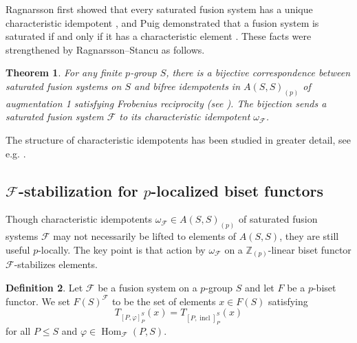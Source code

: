 \documentclass[]{amsart}
\newcommand{\Hom}{\operatorname{Hom}}
\newcommand{\on}[1]{\operatorname{#1}}
\newcommand{\calF}{\mathcal{F}}
\newcommand{\bbZ}{\mathbb{Z}}
\newtheorem{theorem}{Theorem}[section]
\theoremstyle{remark}
\theoremstyle{definition}
\newtheorem{definition}[theorem]{Definition}
\begin{document}
	Ragnarsson first showed that every saturated fusion system has a unique characteristic idempotent \cite{Rag06}, and Puig demonstrated that a fusion system is saturated if and only if it has a characteristic element \cite{Pui09}. These facts were strengthened by Ragnarsson--Stancu as follows. 
	
	\begin{theorem}\cite[Theorem C]{RS13}
		For any finite $p$-group $S$, there is a bijective correspondence between saturated fusion systems on $S$ and bifree idempotents in $A(S,S)_{(p)}$ of augmentation 1 satisfying Frobenius reciprocity (see \cite[Definition 7.1]{RS13}). The bijection sends a saturated fusion system $\calF$ to its characteristic idempotent $\omega_\calF$. 
	\end{theorem}
	
	The structure of characteristic idempotents has been studied in greater detail, see e.g. \cite{BD12, GSY15, Ree16}. 
	
	\subsection{$\calF$-stabilization for $p$-localized biset functors}
	
	Though characteristic idempotents $\omega_\calF \in A(S,S)_{(p)}$ of saturated fusion systems $\calF$ may not necessarily be lifted to elements of $A(S,S)$, they are still useful $p$-locally. The key point is that action by $\omega_\calF$ on a $\bbZ_{(p)}$-linear biset functor $\calF$-stabilizes elements. 
	
	\begin{definition}\cite[Definition 2.2]{RY18}
		Let $\calF$ be a fusion system on a $p$-group $S$ and let $F$ be a $p$-biset functor. We set $F(S)^\calF$ to be the set of elements $x\in F(S)$ satisfying \[T_{[P, \varphi]^S_P}(x) = T_{[P, \on{incl}]^S_P}(x)\] for all $P \leq S$ and $\varphi \in \Hom_\calF(P,S)$. 
	\end{definition}
	
\end{document}
